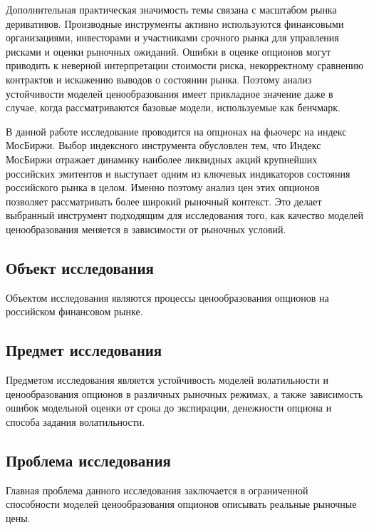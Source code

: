 \documentclass[11pt,a4paper]{article}
\begin{document}
Дополнительная практическая значимость темы связана с масштабом рынка деривативов. Производные инструменты активно используются финансовыми организациями, инвесторами и участниками срочного рынка для управления рисками и оценки рыночных ожиданий. Ошибки в оценке опционов могут приводить к неверной интерпретации стоимости риска, некорректному сравнению контрактов и искажению выводов о состоянии рынка. Поэтому анализ устойчивости моделей ценообразования имеет прикладное значение даже в случае, когда рассматриваются базовые модели, используемые как бенчмарк.

В данной работе исследование проводится на опционах на фьючерс на индекс МосБиржи. Выбор индексного инструмента обусловлен тем, что Индекс МосБиржи отражает динамику наиболее ликвидных акций крупнейших российских эмитентов и выступает одним из ключевых индикаторов состояния российского рынка в целом. Именно поэтому анализ цен этих опционов позволяет рассматривать более широкий рыночный контекст. Это делает выбранный инструмент подходящим для исследования того, как качество моделей ценообразования меняется в зависимости от рыночных условий.

\subsection*{Объект исследования}

Объектом исследования являются процессы ценообразования опционов на российском финансовом рынке.

\subsection*{Предмет исследования}

Предметом исследования является устойчивость моделей волатильности и ценообразования опционов в различных рыночных режимах, а также зависимость ошибок модельной оценки от срока до экспирации, денежности опциона и способа задания волатильности.

\subsection*{Проблема исследования}

Главная проблема данного исследования заключается в ограниченной способности моделей ценообразования опционов описывать реальные рыночные цены.
\end{document}
